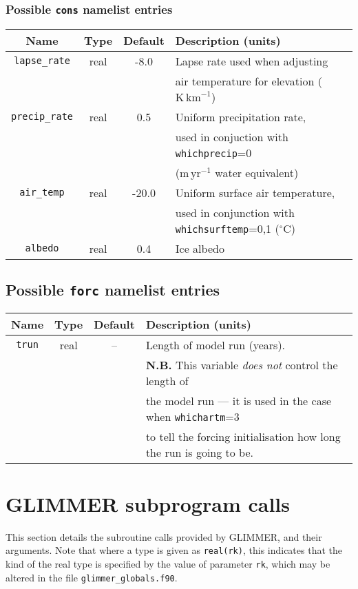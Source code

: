 \subsubsection{Possible \texttt{cons} namelist entries}
%
\begin{center}
\begin{tabular}{|c|c|c|l|}
\hline
Name & Type & Default & Description (units)\\
\hline
\hline
\texttt{lapse\_rate} & real & -8.0 & Lapse rate used when adjusting \\
 & & & air temperature for elevation ($\mathrm{K}\,\mathrm{km}^{-1}$) \\
\hline
\texttt{precip\_rate} & real & 0.5 & Uniform precipitation rate,
\\
 & & & used in conjuction with \texttt{whichprecip}=0 \\
 & & & ($\mathrm{m}\,\mathrm{yr}^{-1}$ water equivalent) \\
\hline
\texttt{air\_temp} & real & -20.0 & Uniform surface air temperature, \\
 & & & used in conjunction with \texttt{whichsurftemp}=0,1 ($^{\circ}\mathrm{C}$) \\
\hline
\texttt{albedo} & real & 0.4 & Ice albedo \\
\hline
\end{tabular}
\end{center}
%
\subsection{Possible \texttt{forc} namelist entries}
%
\begin{center}
\begin{tabular}{|c|c|c|l|}
\hline
Name & Type & Default & Description (units)\\
\hline
\hline
\texttt{trun} & real & -- & Length of model run (years).\\
 & & & {\bf N.B.} This variable {\em does not} control the length of \\
 & & & the model run --- it is used in the case when \texttt{whichartm}=3 \\
 & & & to tell the forcing initialisation how long the run is going to be. \\
\hline
\end{tabular}
\end{center}

\section{GLIMMER subprogram calls}
%
This section details the subroutine calls provided by GLIMMER, and their
arguments. Note that where a type is given as \texttt{real(rk)}, this
indicates that the kind of the real type is specified by the value of
parameter \texttt{rk}, which may be altered in the file \texttt{glimmer\_globals.f90}.
%
